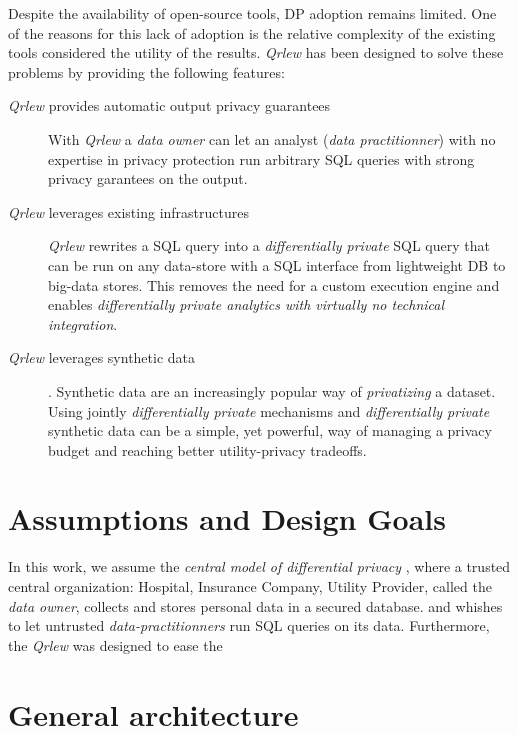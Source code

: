 \documentclass[letterpaper]{article} %
\newcommand{\qrlew}{\emph{Qrlew}}
\begin{document}
Despite the availability of open-source tools, DP adoption remains limited.
One of the reasons for this lack of adoption is the relative complexity of the existing tools considered the utility of the results.
\qrlew{} has been designed to solve these problems by providing the following features:
\begin{description}
    \item[\qrlew{} provides automatic output privacy guarantees] With \qrlew{} a \emph{data owner} can let an analyst (\emph{data practitionner}) with no expertise in privacy protection run arbitrary SQL queries with strong privacy garantees on the output.
    \item[\qrlew{} leverages existing infrastructures] \qrlew{} rewrites a SQL query into a \emph{differentially private} SQL query that can be run on any data-store with a SQL interface from lightweight DB to big-data stores.
This removes the need for a custom execution engine and enables \emph{differentially private analytics with virtually no technical integration}.
    \item[\qrlew{} leverages synthetic data]. Synthetic data are an increasingly popular way of \emph{privatizing} a dataset. Using jointly \emph{differentially private} mechanisms and \emph{differentially private} synthetic data can be a simple, yet powerful, way of managing a privacy budget and reaching better utility-privacy tradeoffs.
\end{description}



\section{Assumptions and Design Goals}

In this work, we assume the \emph{central model of differential privacy} \cite{near2020threat}, where a trusted central organization: Hospital, Insurance Company, Utility Provider, called the \emph{data owner}, collects and stores personal data in a secured database. and whishes to let untrusted \emph{data-practitionners} run SQL queries on its data.
Furthermore, the 
\qrlew{} was designed to ease the 

\section{General architecture}
\end{document}
